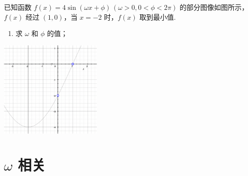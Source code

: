 \documentclass[a4paper , final]{ctexart}
\newenvironment{problemwithfig}[3][2cm]{%
  \item #2
  \par\noindent
  \begin{minipage}[t][8cm][b]{\linewidth}
    \vfill
    \hfill #3
    \par\vspace{#1} %
  \end{minipage}
}{}
\begin{document}
\begin{problems}
\newpage
  \begin{problemwithfig}[5cm]
  {
    已知函数 $f(x) = 4\sin(\omega x + \phi)\,(\omega > 0, 0 < \phi < 2\pi)$ 的部分图像如图所示，$f(x)$ 经过 $(1, 0)$，当 $x = -2$ 时，$f(x)$ 取到最小值.
    \begin{enumerate}[label=(\arabic*)]
      \item 求 $\omega$ 和 $\phi$ 的值；
    \end{enumerate}
  }
  {
    \includegraphics[width=5cm]{Snipaste_2025-07-23_08-50-31.png}
  }
\end{problemwithfig}

\end{problems}


\newpage
\section*{$\omega$ 相关}
\end{document}
